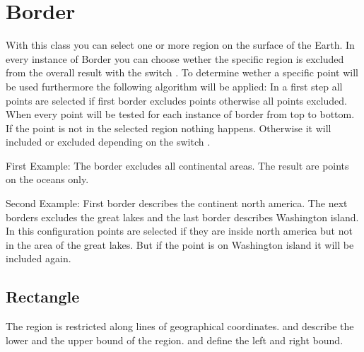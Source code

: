 \clearpage

\section{Border}\label{borderType}
With this class you can select one or more region on the surface of the Earth.
In every instance of Border you can choose wether the specific region is excluded
from the overall result with the switch .
To determine wether a specific point will be used furthermore the following algorithm will be applied:
In a first step all points are selected if first border excludes points otherwise all points excluded.
When every point will be tested for each instance of border from top to bottom.
If the point is not in the selected region nothing happens.
Otherwise it will included or excluded depending on the switch .

First Example: The border excludes all continental areas.
The result are points on the oceans only.

Second Example: First border describes the continent north america. The next borders
excludes the great lakes and the last border describes Washington island.
In this configuration points are selected if they are inside north america
but not in the area of the great lakes. But if the point is on Washington island
it will be included again.


\subsection{Rectangle}
The region is restricted along lines of geographical coordinates.
 and  describe the lower and the upper bound of the region.
 and  define the left and right bound.


